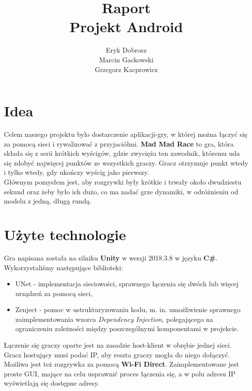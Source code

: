 \documentclass[]{report}
\begin{document}
\title{Raport\\
	\large Projekt Android}
\author{Eryk Dobrosz \\
	Marcin Gackowski \\
	Grzegorz Kacprowicz}

{\let\newpage\relax\maketitle}


\chapter*{Idea}
\quad Celem naszego projektu bylo dostarczenie aplikacji-gry, w której można łączyć się za pomocą sieci i rywalizować z przyjaciółmi. \textbf{Mad Mad Race} to gra, która składa się z serii krótkich wyścigów, gdzie zwycięża ten zawodnik, któremu uda się zdobyć najwięcej punktów ze wszystkich graczy. Gracz otrzymuje punkt wtedy i tylko wtedy, gdy ukończy wyścig jako pierwszy. \\
Głównym pomysłem jest, aby rozgrywki były krótkie i trwały około dwudziestu sekund oraz żeby było ich dużo, co ma nadać grze dynamiki, w odróżnieniu od modelu z jedną, długą rundą.

\chapter*{Użyte technologie}
\quad Gra napisana została na silniku \textbf{Unity} w wersji 2018.3.8 w języku \textbf{C\#}. Wykorzystaliśmy następujące biblioteki:
\begin{itemize}
	\item UNet - implementacja sieciowości, sprawnego łączenia się dwóch lub więcej urządzeń za pomocą sieci,
	\item Zenject - pomoc w ustrukturyzowaniu kodu, m. in. umożliwienie sprawnego zaimplementowania wzorca \textit{Dependency Injection}, polegającego na ograniczeniu zależności między poszczególnymi komponentami w projekcie.
\end{itemize}

Łączenie się graczy oparte jest na zasadzie host-klient w obrębie jednej sieci. Gracz hostujący musi podać IP, aby reszta graczy mogła do niego dołączyć. Możliwa jest też rozgrywka za pomocą \textbf{Wi-Fi Direct}. Zaimplementowane jest proste GUI, mające na celu usprawnić proces łączenia się, a w polu adresu IP wyświetlają się dostępne adresy.
\end{document}
